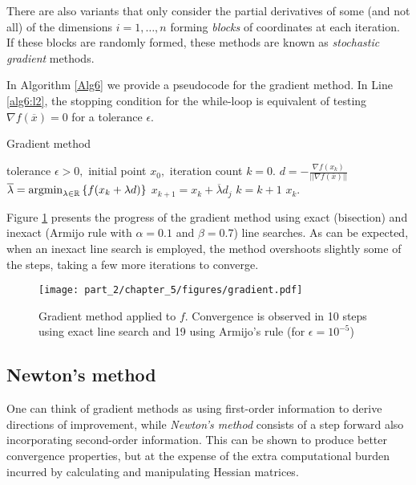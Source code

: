 There are also variants that only consider the partial derivatives of some (and not all) of the dimensions $i = 1, \dots, n$ forming \emph{blocks} of coordinates at each iteration. If these blocks are randomly formed, these methods are known as \emph{stochastic gradient} methods. 

In Algorithm \ref{Alg6} we provide a pseudocode for the gradient method. In Line \ref{alg6:l2}, the stopping condition for the while-loop is equivalent of testing $\nabla f(\overline{x}) = 0$ for a tolerance $\epsilon$. 

\begin{algorithm}[H]
\caption{Gradient method} \label{Alg6}
\begin{algorithmic}[1] %
 tolerance $\epsilon > 0,$ initial point $x_0,$ iteration count $k = 0$. 
 \label{alg6:l2}
        \State $d = -\frac{\nabla f(x_k)}{||\nabla f(\overline{x})||}$
        \State $\overline{\lambda} = \mathop{\rm argmin}_{\lambda \in \mathbb{R}}\left\{ f(x_k + \lambda d) \right \}$
        \State $x_{k+1} = x_k + \overline{\lambda}  d_j$
    \State $k = k+1$    
\EndWhile
{} $x_k$.
\end{algorithmic}
\end{algorithm}

Figure \ref{fig:gradient} presents the progress of the gradient method using exact (bisection) and inexact (Armijo rule with $\alpha =0.1$ and $\beta=0.7$) line searches. As can be expected, when an inexact line search is employed, the method overshoots slightly some of the steps, taking a few more iterations to converge.  

\begin{figure}[h]
\texttt{[image: part\_2/chapter\_5/figures/gradient.pdf]}
\caption{Gradient method applied to $f$. Convergence is observed in 10 steps using exact line search and 19 using Armijo's rule (for $\epsilon = 10^{-5}$)} \label{fig:gradient}
\end{figure}


\subsection{Newton's method}

One can think of gradient methods as using first-order information to derive directions of improvement, while \emph{Newton's method} consists of a step forward also incorporating second-order information. This can be shown to produce better convergence properties, but at the expense of the extra computational burden incurred by calculating and manipulating Hessian matrices.

